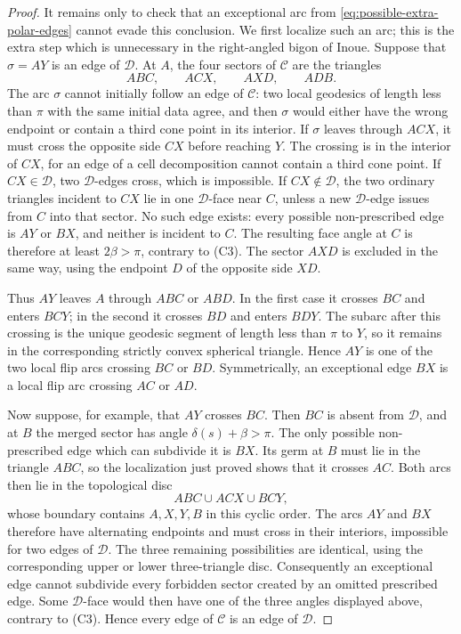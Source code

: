 \documentclass[12pt,a4paper]{article}
\theoremstyle{definition}
\begin{document}
\begin{proof}
It remains only to check that an exceptional arc from
\eqref{eq:possible-extra-polar-edges} cannot evade this conclusion. We first
localize such an arc; this is the extra step which is unnecessary in the
right-angled bigon of Inoue. Suppose that \(\sigma=AY\) is an edge of
\(\mathcal D\). At \(A\), the four sectors of \(\mathcal C\) are the
triangles
\[
        ABC,\qquad ACX,\qquad AXD,\qquad ADB.
\]
The arc \(\sigma\) cannot initially follow an edge of \(\mathcal C\): two
local geodesics of length less than \(\pi\) with the same initial data agree,
and then \(\sigma\) would either have the wrong endpoint or contain a third
cone point in its interior. If \(\sigma\) leaves through \(ACX\), it must
cross the opposite side \(CX\) before reaching \(Y\). The crossing is in the
interior of \(CX\), for an edge of a cell decomposition cannot contain a
third cone point. If \(CX\in\mathcal D\), two \(\mathcal D\)-edges cross,
which is impossible. If \(CX\notin\mathcal D\), the two ordinary triangles
incident to \(CX\) lie in one \(\mathcal D\)-face near \(C\), unless a new
\(\mathcal D\)-edge issues from \(C\) into that sector. No such edge exists:
every possible non-prescribed edge is \(AY\) or \(BX\), and neither is
incident to \(C\). The resulting face angle at \(C\) is therefore at least
\(2\beta>\pi\), contrary to \textup{(C3)}. The sector \(AXD\) is excluded in
the same way, using the endpoint \(D\) of the opposite side \(XD\).

Thus \(AY\) leaves \(A\) through \(ABC\) or \(ABD\). In the first case it
crosses \(BC\) and enters \(BCY\); in the second it crosses \(BD\) and enters
\(BDY\). The subarc after this crossing is the unique geodesic segment of
length less than \(\pi\) to \(Y\), so it remains in the corresponding strictly
convex spherical triangle. Hence \(AY\) is one of the two local flip arcs
crossing \(BC\) or \(BD\). Symmetrically, an exceptional edge \(BX\) is a
local flip arc crossing \(AC\) or \(AD\).

Now suppose, for example, that \(AY\) crosses \(BC\). Then \(BC\) is absent
from \(\mathcal D\), and at \(B\) the merged sector has angle
\(\delta(s)+\beta>\pi\). The only possible non-prescribed edge which can
subdivide it is \(BX\). Its germ at \(B\) must lie in the triangle \(ABC\),
so the localization just proved shows that it crosses \(AC\). Both arcs then
lie in the topological disc
\[
        ABC\cup ACX\cup BCY,
\]
whose boundary contains \(A,X,Y,B\) in this cyclic order. The arcs \(AY\)
and \(BX\) therefore have alternating endpoints and must cross in their
interiors, impossible for two edges of \(\mathcal D\). The three remaining
possibilities are identical, using the corresponding upper or lower
three-triangle disc. Consequently an exceptional edge cannot subdivide every
forbidden sector created by an omitted prescribed edge. Some
\(\mathcal D\)-face would then have one of the three angles displayed above,
contrary to \textup{(C3)}. Hence every edge of \(\mathcal C\) is an edge of
\(\mathcal D\).


\end{proof}
\end{document}
